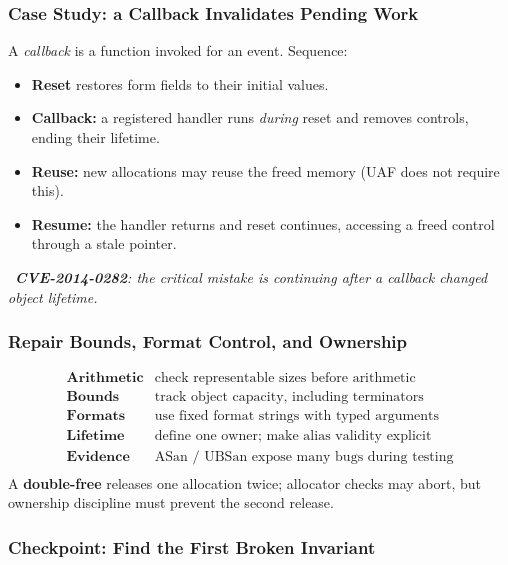 \documentclass[hidelinks]{article}
\newcommand{\callout}[1]{\par\smallskip\noindent{\color{capri}$\blacktriangleright$}\ \textit{#1}\par\smallskip}
\begin{document}
\subsubsection{Case Study: a Callback Invalidates Pending Work}

A \emph{callback} is a function invoked for an event. Sequence:
\begin{itemize}
    \item \textbf{Reset} restores form fields to their initial values.
    \item \textbf{Callback:} a registered handler runs \emph{during} reset and removes controls, ending their lifetime.
    \item \textbf{Reuse:} new allocations may reuse the freed memory (UAF does not require this).
    \item \textbf{Resume:} the handler returns and reset continues, accessing a freed control through a stale pointer.
\end{itemize}

\callout{\textbf{CVE-2014-0282}: the critical mistake is \emph{continuing after a callback changed object lifetime}.}

\subsubsection{Repair Bounds, Format Control, and Ownership}

\[
\begin{array}{ll}
\textbf{Arithmetic} & \text{check representable sizes before arithmetic}\\
\textbf{Bounds}     & \text{track object capacity, including terminators}\\
\textbf{Formats}    & \text{use fixed format strings with typed arguments}\\
\textbf{Lifetime}   & \text{define one owner; make alias validity explicit}\\
\textbf{Evidence}   & \text{ASan / UBSan expose many bugs during testing}\\
\end{array}
\]
A \textbf{double-free} releases one allocation twice; allocator checks may abort, but ownership discipline must prevent the second release.

\subsubsection{Checkpoint: Find the First Broken Invariant}
\end{document}
